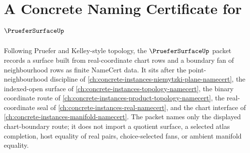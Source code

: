 \chapter{A Concrete Naming Certificate for $\PrueferSurfaceUp$}
\label{ch:concrete-instances-pruefer-surface-namecert}

Following Pruefer and Kelley-style topology, the $\PrueferSurfaceUp$ packet records a surface built from real-coordinate chart rows and a boundary fan of neighbourhood rows as finite NameCert data. It sits after the point-neighbourhood discipline of \autoref{ch:concrete-instances-niemytzki-plane-namecert}, the indexed-open surface of \autoref{ch:concrete-instances-topology-namecert}, the binary coordinate route of \autoref{ch:concrete-instances-product-topology-namecert}, the real-coordinate seal of \autoref{ch:concrete-instances-real-namecert}, and the chart interface of \autoref{ch:concrete-instances-manifold-namecert}. The packet names only the displayed chart-boundary route; it does not import a quotient surface, a selected atlas completion, host equality of real pairs, choice-selected fans, or ambient manifold equality.

